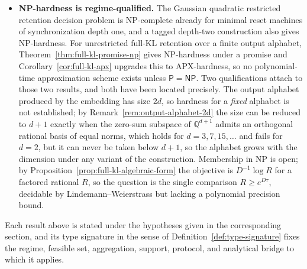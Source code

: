 \documentclass[12pt]{article}
\theoremstyle{definition}
\begin{document}
\begin{itemize}[leftmargin=1.8em]
\item \textbf{NP-hardness is regime-qualified.}
The Gaussian quadratic restricted retention decision problem is NP-complete
already for minimal reset machines of synchronization depth one, and a tagged
depth-two construction also gives NP-hardness.  For unrestricted full-KL
retention over a finite output alphabet,
Theorem~\ref{thm:full-kl-promise-np} gives NP-hardness under a promise and
Corollary~\ref{cor:full-kl-apx} upgrades this to APX-hardness, so no
polynomial-time approximation scheme exists unless $\mathsf P=\mathsf{NP}$.
Two qualifications attach to those two results, and both have been located
precisely.  The output alphabet produced by the embedding has size $2d$, so
hardness for a \emph{fixed} alphabet is not established; by
Remark~\ref{rem:output-alphabet-2d} the size can be reduced to $d+1$ exactly
when the zero-sum subspace of $\mathbb Q^{d+1}$ admits an orthogonal rational
basis of equal norms, which holds for $d=3,7,15,\dots$ and fails for $d=2$, but
it can never be taken below $d+1$, so the alphabet grows with the dimension
under any variant of the construction.  Membership in NP is open; by
Proposition~\ref{prop:full-kl-algebraic-form} the objective is $D^{-1}\log R$
for a factored rational $R$, so the question is the single comparison
$R\ge e^{D\tau}$, decidable by Lindemann--Weierstrass but lacking a polynomial
precision bound.
\end{itemize}

Each result above is stated under the hypotheses given in the corresponding
section, and its type signature in the sense of
Definition~\ref{def:type-signature} fixes the regime, feasible set,
aggregation, support, protocol, and analytical bridge to which it applies.
\end{document}
